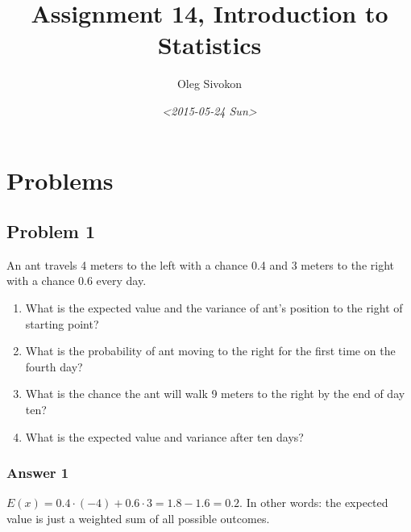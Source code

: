 \documentclass[11pt]{article}
\author{Oleg Sivokon}
\date{\textit{<2015-05-24 Sun>}}
\title{Assignment 14, Introduction to Statistics}
\begin{document}
\maketitle
\tableofcontents


\clearpage

\section{Problems}
\label{sec:orgheadline24}

\subsection{Problem 1}
\label{sec:orgheadline5}
An ant travels 4 meters to the left with a chance 0.4 and 3 meters to the right
with a chance 0.6 every day.
\begin{enumerate}
\item What is the expected value and the variance of ant's position to the right
of starting point?
\item What is the probability of ant moving to the right for the first time
on the fourth day?
\item What is the chance the ant will walk 9 meters to the right by the end of
day ten?
\item What is the expected value and variance after ten days?
\end{enumerate}

\subsubsection{Answer 1}
\label{sec:orgheadline1}
\(E(x)=0.4 \cdot (-4) + 0.6 \cdot 3 = 1.8 - 1.6 = 0.2\).  In other words: the
expected value is just a weighted sum of all possible outcomes.
\end{document}
